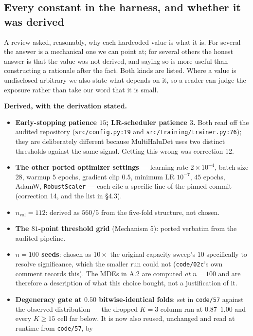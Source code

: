 \documentclass[10pt]{article} %
\begin{document}
\subsection{Every constant in the harness, and whether it was derived}
\label{sec:constants}

A review asked, reasonably, why each hardcoded value is what it is. For several
the answer is a mechanical one we can point at; for several others the honest
answer is that the value was not derived, and saying so is more useful than
constructing a rationale after the fact. Both kinds are listed. Where a value
is undisclosed-arbitrary we also state what depends on it, so a reader can
judge the exposure rather than take our word that it is small.

\medskip\noindent\textbf{Derived, with the derivation stated.}
\begin{itemize}\itemsep2pt
\item \textbf{Early-stopping patience $15$; LR-scheduler patience $3$.} Both
  read off the audited repository (\texttt{src/config.py:19} and
  \texttt{src/training/trainer.py:76}); they are deliberately different because
  MultiHaluDet uses two distinct thresholds against the same signal. Getting
  this wrong was correction 12.
\item \textbf{The other ported optimizer settings} --- learning rate $2\times
  10^{-4}$, batch size $28$, warmup $5$ epochs, gradient clip $0.5$, minimum LR
  $10^{-7}$, $45$ epochs, AdamW, \texttt{RobustScaler} --- each cite a specific
  line of the pinned commit (correction 14, and the list in §4.3).
\item \textbf{$n_{\text{val}}=112$}: derived as $560/5$ from the five-fold
  structure, not chosen.
\item \textbf{The $81$-point threshold grid} (Mechanism 5): ported verbatim
  from the audited pipeline.
\item \textbf{$n=100$ seeds}: chosen as $10\times$ the original capacity
  sweep's $10$ specifically to resolve significance, which the smaller run
  could not (\texttt{code/02c}'s own comment records this). The MDEs in A.2 are
  computed \emph{at} $n=100$ and are therefore a description of what this
  choice bought, not a justification of it.
\item \textbf{Degeneracy gate at $0.50$ bitwise-identical folds}: set in
  \texttt{code/57} against the observed distribution --- the dropped $K=3$
  column ran at $0.87$--$1.00$ and every $K\geq15$ cell far below. It is now
  also reused, unchanged and read at runtime from \texttt{code/57}, by

\end{itemize}
\end{document}
